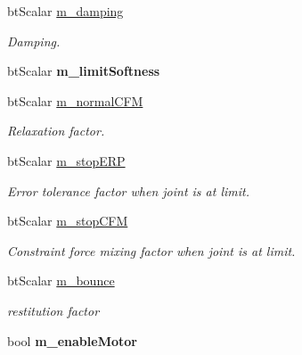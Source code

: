 \begin{DoxyCompactItemize}
\mbox{\label{classbtRotationalLimitMotor_a4aaabbd7dac171217b2ac36c3f2bc240}} 
bt\+Scalar \hyperlink{classbtRotationalLimitMotor_a4aaabbd7dac171217b2ac36c3f2bc240}{m\+\_\+damping}
\begin{DoxyCompactList}\small\item\em Damping. \end{DoxyCompactList}\item 
\mbox{\label{classbtRotationalLimitMotor_a7f3a07a418826d16a0917a57af079867}} 
bt\+Scalar {\bfseries m\+\_\+limit\+Softness}
\item 
bt\+Scalar \hyperlink{classbtRotationalLimitMotor_a3d06f5a5de013fd97f39cf63273dce45}{m\+\_\+normal\+C\+FM}
\begin{DoxyCompactList}\small\item\em Relaxation factor. \end{DoxyCompactList}\item 
\mbox{\label{classbtRotationalLimitMotor_a88139c248dfa9b9ab4a8a2431e86aa45}} 
bt\+Scalar \hyperlink{classbtRotationalLimitMotor_a88139c248dfa9b9ab4a8a2431e86aa45}{m\+\_\+stop\+E\+RP}
\begin{DoxyCompactList}\small\item\em Error tolerance factor when joint is at limit. \end{DoxyCompactList}\item 
\mbox{\label{classbtRotationalLimitMotor_ae2f949d3de4c3b059cd914e11fd5ebcd}} 
bt\+Scalar \hyperlink{classbtRotationalLimitMotor_ae2f949d3de4c3b059cd914e11fd5ebcd}{m\+\_\+stop\+C\+FM}
\begin{DoxyCompactList}\small\item\em Constraint force mixing factor when joint is at limit. \end{DoxyCompactList}\item 
\mbox{\label{classbtRotationalLimitMotor_a4cfd3d5d8d3ba75f1ce4b59f01017364}} 
bt\+Scalar \hyperlink{classbtRotationalLimitMotor_a4cfd3d5d8d3ba75f1ce4b59f01017364}{m\+\_\+bounce}
\begin{DoxyCompactList}\small\item\em restitution factor \end{DoxyCompactList}\item 
\mbox{\label{classbtRotationalLimitMotor_a8a515092c2d9f564d6bfe2774a56a394}} 
bool {\bfseries m\+\_\+enable\+Motor}
\end{DoxyCompactItemize}

